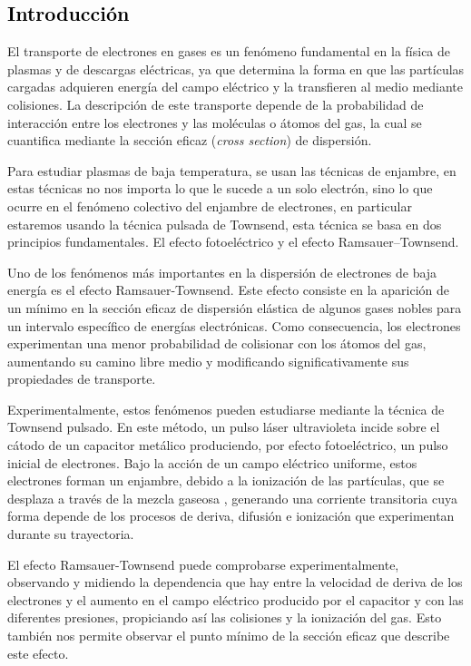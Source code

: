 \textcolor{black}{\section{Introducción}}

\noindent El transporte de electrones en gases es un fenómeno fundamental en la física de plasmas y de descargas eléctricas, ya que determina la forma en que las partículas cargadas adquieren energía del campo eléctrico y la transfieren al medio mediante colisiones. La descripción de este transporte depende de la probabilidad de interacción entre los electrones y las moléculas o átomos del gas, la cual se cuantifica mediante la sección eficaz (\textit{cross section}) de dispersión. \cite{Urquijo}

Para estudiar plasmas de baja temperatura, se usan las técnicas de enjambre, en estas técnicas no nos importa lo que le sucede a un solo electrón, sino lo que ocurre en el fenómeno colectivo del enjambre de electrones, en particular estaremos usando la técnica pulsada de Townsend, esta técnica se basa en dos principios fundamentales. El efecto fotoeléctrico y el efecto Ramsauer--Townsend.

Uno de los fenómenos más importantes en la dispersión de electrones de baja energía es el efecto Ramsauer-Townsend. Este efecto consiste en la aparición de un mínimo en la sección eficaz de dispersión elástica de algunos gases nobles para un intervalo específico de energías electrónicas. Como consecuencia, los electrones experimentan una menor probabilidad de colisionar con los átomos del gas, aumentando su camino libre medio y modificando significativamente sus propiedades de transporte. \cite{Olmo}

Experimentalmente, estos fenómenos pueden estudiarse mediante la técnica de Townsend pulsado. En este método, un pulso láser ultravioleta incide sobre el cátodo de un capacitor metálico produciendo, por efecto fotoeléctrico, un pulso inicial de electrones. Bajo la acción de un campo eléctrico uniforme, estos electrones forman un enjambre, debido a la ionización de las partículas, que se desplaza a través de la mezcla gaseosa , generando una corriente transitoria cuya forma depende de los procesos de deriva, difusión e ionización que experimentan durante su trayectoria. \cite{Olmo}

El efecto Ramsauer-Townsend puede comprobarse experimentalmente, observando y midiendo la dependencia que hay entre la velocidad de deriva de los electrones y el aumento en el campo eléctrico producido por el capacitor y con las diferentes presiones, propiciando así las colisiones y la ionización del gas. Esto también nos permite observar el punto mínimo de la sección eficaz que describe este efecto. \cite{Swarm}
\noindent 